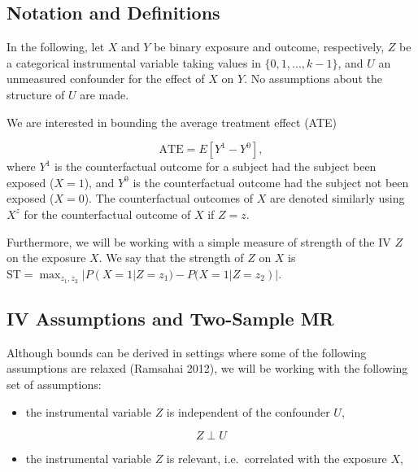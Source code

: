 \documentclass[
]{article}
\providecommand{\tightlist}{%
  \setlength{\itemsep}{0pt}\setlength{\parskip}{0pt}}
\theoremstyle{plain}
\begin{document}
\hypertarget{notation-and-definitions}{%
\subsection{Notation and Definitions}\label{notation-and-definitions}}

In the following, let \(X\) and \(Y\) be binary exposure and outcome, respectively, \(Z\) be a categorical instrumental variable taking values in \(\{0, 1, ..., k-1\}\), and \(U\) an unmeasured confounder for the effect of \(X\) on \(Y\). No assumptions about the structure of \(U\) are made.

We are interested in bounding the average treatment effect (ATE)

\[
\text{ATE} = E[Y^1 - Y^0],
\]
where \(Y^1\) is the counterfactual outcome for a subject had the subject been exposed (\(X = 1\)), and \(Y^0\) is the counterfactual outcome had the subject not been exposed (\(X = 0\)). The counterfactual outcomes of \(X\) are denoted similarly using \(X^z\) for the counterfactual outcome of \(X\) if \(Z = z\).

Furthermore, we will be working with a simple measure of strength of the IV \(Z\) on the exposure \(X\). We say that the strength of \(Z\) on \(X\) is \(\text{ST} = \max_{z_1,z_2} | P(X = 1 | Z = z_1) - P(X = 1 | Z = z_2) |\).

\hypertarget{iv-assumptions-and-two-sample-mr}{%
\subsection{IV Assumptions and Two-Sample MR}\label{iv-assumptions-and-two-sample-mr}}

Although bounds can be derived in settings where some of the following assumptions are relaxed (Ramsahai 2012), we will be working with the following set of assumptions:

\begin{itemize}
\tightlist
\item
  the instrumental variable \(Z\) is independent of the confounder \(U\),
\end{itemize}

\begin{equation}
  Z \perp U \label{eq:z_ind_u}\tag{A1}
\end{equation}

\begin{itemize}
\tightlist
\item
  the instrumental variable \(Z\) is relevant, i.e.~correlated with the exposure \(X\),
\end{itemize}
\end{document}
